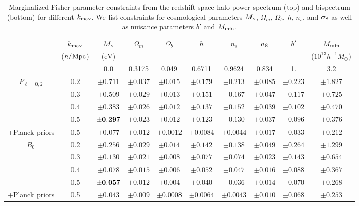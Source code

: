 \begin{table}
    \caption{Marginalized Fisher parameter constraints from the redshift-space halo power 
    spectrum (top) and bispectrum (bottom) for different $k_{\rm max}$. We list 
    constraints for cosmological parameters $M_\nu$, $\Omega_m$, $\Omega_b$, $h$, $n_s$, 
    and $\sigma_8$ as well as nuisance parameters $b'$ and $M_{\rm min}$.} 
\begin{center} 
    \begin{tabular}{cccccccccc} \toprule
        & $k_{\rm max}$ & $M_\nu$ & $\Omega_m$ & $\Omega_b$ & $h$ & $n_s$ & $\sigma_8$ & $b'$ & $M_{\rm min}$ \\
        & ({\footnotesize $h/{\rm Mpc}$}) &({\footnotesize eV}) & & & & & & & ({\footnotesize $10^{13} h^{-1}M_\odot$}) \\[3pt] \hline\hline

        &     & 0.0 & 0.3175 & 0.049 & 0.6711 & 0.9624 & 0.834 & 1. & 3.2  \\ 
        $P_{\ell=0,2}$  & 0.2 & $\pm0.711$ & $\pm0.037$ & $\pm0.015$ & $\pm0.179$ & $\pm0.213$ & $\pm0.085$ & $\pm0.223$ & $\pm1.827$\\
        & 0.3 & $\pm0.509$ & $\pm0.029$ & $\pm0.013$ & $\pm0.151$ & $\pm0.167$ & $\pm0.047$ & $\pm0.117$ & $\pm0.725$\\
        & 0.4 & $\pm0.383$ & $\pm0.026$ & $\pm0.012$ & $\pm0.137$ & $\pm0.152$ & $\pm0.039$ & $\pm0.102$ & $\pm0.470$\\
        & 0.5 & $\pm{\bf 0.297}$ & $\pm0.023$ & $\pm0.012$ & $\pm0.123$ & $\pm0.130$ & $\pm0.037$ & $\pm0.096$ & $\pm0.376$\\
    {\footnotesize +Planck priors} & 0.5 &$\pm0.077$& $\pm0.012$ & $\pm0.0012$ & $\pm0.0084$ & $\pm0.0044$ & $\pm0.017$ & $\pm0.033$ & $\pm0.212$\\\hline
    $B_0$  & 0.2 & $\pm0.256$ & $\pm0.029$ & $\pm0.014$ & $\pm0.142$ & $\pm0.138$ & $\pm0.049$ & $\pm0.264$ & $\pm1.299$\\
            & 0.3 & $\pm0.130$ & $\pm0.021$ & $\pm0.008$ & $\pm0.077$ & $\pm0.074$ & $\pm0.023$ & $\pm0.143$ & $\pm0.654$\\
            & 0.4 & $\pm0.078$ & $\pm0.015$ & $\pm0.006$ & $\pm0.052$ & $\pm0.047$ & $\pm0.016$ & $\pm0.088$ & $\pm0.367$\\
            & 0.5 & $\pm{\bf 0.057}$ & $\pm0.012$ & $\pm0.004$ & $\pm0.040$ & $\pm0.036$ & $\pm0.014$ & $\pm0.070$ & $\pm0.268$\\
{\footnotesize +Planck priors} & 0.5 &$\pm0.043$& $\pm0.009$ & $\pm0.0008$ & $\pm0.0064$ & $\pm0.0043$ & $\pm0.010$ & $\pm0.068$ & $\pm0.253$\\[3pt]

    \hline
\end{tabular} \label{tab:forecast}
\end{center}
\end{table}


